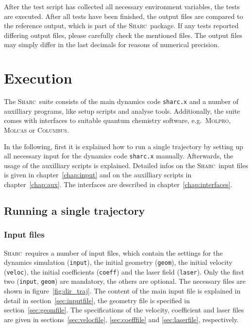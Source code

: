 \documentclass[a4paper,11pt,DIV=15,openany,twoside=false]{scrbook}
\newcommand{\sharc}{\textsc{Sharc}}
\newcommand{\ttt}[1]{\texttt{#1}}
\begin{document}
After the test script has collected all necessary environment variables, the tests are executed. After all tests have been finished, the output files are compared to the reference output, which is part of the \sharc\ package. If any tests reported differing output files, please carefully check the mentioned files. The output files may simply differ in the last decimals for reasons of numerical precision. 


\chapter{Execution}

The \sharc\ suite consists of the main dynamics code \ttt{sharc.x} and a number of auxilliary programs, like setup scripts and analyse tools. Additionally, the suite comes with interfaces to suitable quantum chemistry software, e.g.\ \textsc{Molpro}, \textsc{Molcas} or \textsc{Columbus}. 

In the following, first it is explained how to run a single trajectory by setting up all necessary input for the dynamics code \ttt{sharc.x} manually. Afterwards, the usage of the auxilliary scripts is explained. Detailed infos on the \sharc\ input files is given in chapter~\ref{chap:input} and on the auxilliary scripts in chapter~\ref{chap:aux}. The interfaces are described in chapter~\ref{chap:interfaces}.

\section{Running a single trajectory}

\subsection{Input files}

\sharc\ requires a number of input files, which contain the settings for the dynamics simulation (\ttt{input}), the initial geometry (\ttt{geom}), the initial velocity (\ttt{veloc}), the initial coefficients (\ttt{coeff}) and the laser field (\ttt{laser}). Only the first two (\ttt{input}, \ttt{geom}) are mandatory, the others are optional. The necessary files are shown in figure~\ref{fig:dir_traj}. 
The content of the main input file is explained in detail in section~\ref{sec:inputfile}, the geometry file is specified in section~\ref{sec:geomfile}. The specifications of the velocity, coefficient and laser files are given in sections~\ref{sec:velocfile}, \ref{sec:coefffile} and \ref{sec:laserfile}, respectively.
\end{document}
